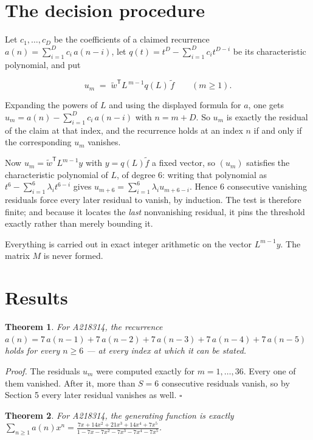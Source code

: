 \documentclass[11pt]{article}
\newtheorem{theorem}{Theorem}
\theoremstyle{definition}
\begin{document}
\section{The decision procedure}

Let $c_1,\dots,c_D$ be the coefficients of a claimed recurrence $a(n) = \sum_{i=1}^{D} c_i\,a(n-i)$, let $q(t) = t^{D} - \sum_{i=1}^{D} c_i t^{D-i}$ be its characteristic polynomial, and put

\[u_m \;=\; \tilde w^{\mathsf T} L^{\,m-1} q(L)\,\tilde f \qquad (m \ge 1).\]

Expanding the powers of $L$ and using the displayed formula for $a$, one gets $u_m = a(n) - \sum_{i=1}^{D} c_i\,a(n-i)$ with $n = m + D$. So $u_m$ is exactly the residual of the claim at that index, and the recurrence holds at an index $n$ if and only if the corresponding $u_m$ vanishes.

Now $u_m = \tilde w^{\mathsf T} L^{m-1} y$ with $y = q(L)\tilde f$ a fixed vector, so $(u_m)$ satisfies the characteristic polynomial of $L$, of degree $6$: writing that polynomial as $t^{6} - \sum_{i=1}^{6} \lambda_i t^{6-i}$ gives $u_{m+6} = \sum_{i=1}^{6} \lambda_i u_{m+6-i}$. Hence $6$ consecutive vanishing residuals force every later residual to vanish, by induction. The test is therefore finite; and because it locates the {\itshape last} nonvanishing residual, it pins the threshold exactly rather than merely bounding it.

Everything is carried out in exact integer arithmetic on the vector $L^{m-1}y$. The matrix $M$ is never formed.

\section{Results}

\begin{theorem} For A218314, the recurrence $a(n) = 7\,a(n-1) + 7\,a(n-2) + 7\,a(n-3) + 7\,a(n-4) + 7\,a(n-5)$ holds for every $n \ge 6$ --- at every index at which it can be stated.\end{theorem}

{\itshape Proof.} The residuals $u_m$ were computed exactly for $m = 1,\dots,36$. Every one of them vanished. After it, more than $S = 6$ consecutive residuals vanish, so by Section 5 every later residual vanishes as well. $\square$

\begin{theorem} For A218314, the generating function is exactly $\sum_{n\ge 1} a(n)x^n = \frac{7x + 14x^{2} + 21x^{3} + 14x^{4} + 7x^{5}}{1 - 7x - 7x^{2} - 7x^{3} - 7x^{4} - 7x^{5}}$.\end{theorem}
\end{document}
